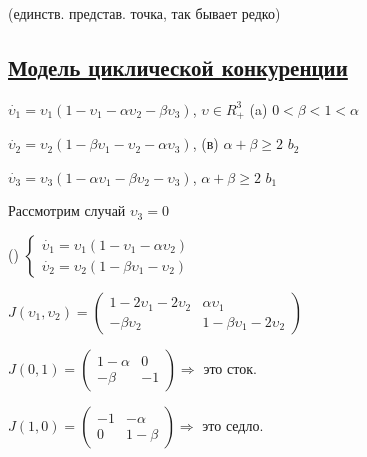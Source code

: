 \documentclass[oneside, final, 12pt]{article}
\begin{document}
(единств. представ. точка, так бывает редко)

\vspace{0.5cm}
\subsection*{{\Large \underline{Модель циклической конкуренции}}}

\vspace{0.5cm}
\(\dot{\upsilon_1} = \upsilon_1(1-\upsilon_1 - \alpha\upsilon_2 - \beta\upsilon_3) \), \hspace{3cm}\( \upsilon \in R_+^3\) \hspace{2cm} (a) \(0 < \beta < 1 < \alpha\)

\(\dot{\upsilon_2} = \upsilon_2(1-\beta\upsilon_1 - \upsilon_2 - \alpha\upsilon_3) \), \hspace{6.3cm} (в) \(\alpha+\beta\geq 2\) \(b_2\)

\(\dot{\upsilon_3} = \upsilon_3(1-\alpha\upsilon_1 - \beta\upsilon_2 - \upsilon_3) \),
\hspace{6.6cm} \(\alpha+\beta\geq 2\) \(b_1\)


\vspace{0.5cm}
Рассмотрим случай { \underline{\(\upsilon_3 = 0\)}}

\vspace{0.5cm}
({})
\(
 \begin{cases}
    \dot{\upsilon_1} = \upsilon_1(1-\upsilon_1 - \alpha\upsilon_2 ) 
    \\
    \dot{\upsilon_2} = \upsilon_2(1-\beta\upsilon_1 - \upsilon_2 ) 
 \end{cases}
\)

\vspace{0.5cm}
\(
J(\upsilon_1,\upsilon_2) = 
 \begin{pmatrix}
 1-2\upsilon_1-2\upsilon_2 & \alpha\upsilon_1\\
 -\beta\upsilon_2 & 1-\beta\upsilon_1 - 2\upsilon_2
 \end{pmatrix}
\)

\vspace{0.5cm}

\(
 J(0,1) = 
 \begin{pmatrix}
 1-\alpha & 0 \\ 
 -\beta & -1
 \end{pmatrix}
\)\hspace{0.5cm}\(\Rightarrow\) это сток.

\vspace{0.5cm}
\(
 J(1,0) = 
 \begin{pmatrix}
 -1 & -\alpha \\ 
 0 & 1 - \beta
 \end{pmatrix}
\)\hspace{0.5cm}\(\Rightarrow\) это седло.
\end{document}
